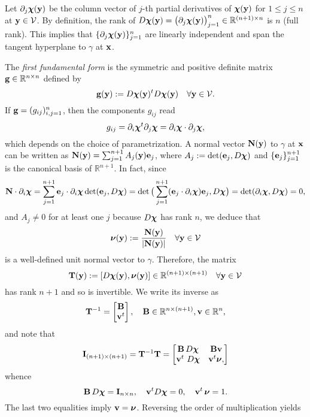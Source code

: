Let $\partial_j{\boldsymbol \chi}({\bf y})$ be the column vector of $j$-th partial derivatives of
${\boldsymbol \chi}({\bf y})$ for $1\le j\le n$ at ${\bf y}\in {\mathcal V}$.
By definition, the rank of $D {\boldsymbol \chi}({\bf y}) = \big(\partial_j{\boldsymbol \chi}({\bf y})\big)_{j=1}^n
\in  {\mathbb R}^{(n+1)\times n}$ is  $n$ (full rank).
This implies that $\{\partial_j{\boldsymbol \chi}({\bf y})\}_{j=1}^n$ are linearly independent and span
the tangent hyperplane to $\gamma$ at ${\bf x}$.

The \emph{first fundamental form} is the symmetric and positive definite matrix
${\bf g}\in {\mathbb R}^{n\times n}$ defined by
\begin{equation}\label{dg:d:first}
{\bf g}({\bf y}) := D {\boldsymbol \chi}({\bf y})^t D {\boldsymbol \chi}({\bf y}) \quad\forall {\bf y}\in\mathcal V.
\end{equation}
If ${\bf g} = (g_{ij})_{i,j=1}^n$, then the components $g_{ij}$ read
$$
g_{ij} = \partial_i{\boldsymbol \chi}^t\partial_j{\boldsymbol \chi} = \partial_i{\boldsymbol \chi}\cdot\partial_j{\boldsymbol \chi},
$$
which depends on the choice of parametrization.
A normal vector ${\bf N}({\bf y})$ to $\gamma$ at ${\bf x}$ can be written as
${\bf N}({\bf y}) = \sum_{j=1}^{n+1} A_j({\bf y}) {\bf e}_j$, where
$A_j:= \textrm{det}({\bf e}_j, D {\boldsymbol \chi})$ and
$\{ {\bf e}_j \}_{j=1}^{n+1}$ is the canonical basis of $\mathbb R^{n+1}$. In fact,
since
%
\[
{\bf N} \cdot \partial_i{\boldsymbol \chi} = \sum_{j=1}^{n+1} {\bf e}_j\cdot\partial_i{\boldsymbol \chi}
\det({\bf e}_j,D{\boldsymbol \chi}) = \det \big( \sum_{j=1}^{n+1} ({\bf e}_j\cdot\partial_i{\boldsymbol \chi})
{\bf e}_j,D{\boldsymbol \chi}\big) = \det(\partial_i{\boldsymbol \chi},D{\boldsymbol \chi}) = 0,
\]
%
and $A_j\ne0$ for at least one $j$ because $D{\boldsymbol \chi}$ has rank $n$, we deduce that
%
\begin{equation}\label{unit-normal}
{\boldsymbol \nu} ({\bf y}) := \frac{{\bf N}({\bf y})}{|{\bf N}({\bf y})|} \quad\forall {\bf y}\in\mathcal V
\end{equation}
%
is a well-defined unit normal vector to $\gamma$. Therefore, the matrix
%
\[
{\bf T} ({\bf y}) := [D{\boldsymbol \chi}({\bf y}),{\boldsymbol \nu}({\bf y})] \in \mathbb{R}^{(n+1)\times(n+1)}
\quad\forall {\bf y}\in\mathcal V
\]
%
has rank $n+1$ and so is invertible. We write its inverse as
%
\[
{\bf T}^{-1} = \begin{bmatrix} {\bf B} \\ {\bf v}^t \end{bmatrix},
\quad
{\bf B} \in \mathbb{R}^{n\times(n+1)}, {\bf v}\in\mathbb{R}^n,
\]
%
and note that
%
\[
{\bf I}_{(n+1)\times(n+1)} = {\bf T}^{-1}{\bf T} =
\begin{bmatrix}
{\bf B} \, D{\boldsymbol \chi} & {\bf B} {\bf v} \\ {\bf v}^t\ D{\boldsymbol \chi} & {\bf v}^t{\boldsymbol \nu},
\end{bmatrix}  
\]
%
whence
%
\[
{\bf B} \, D{\boldsymbol \chi} = {\bf I}_{n\times n},
\quad
{\bf v}^t D{\boldsymbol \chi} = 0,
\quad
{\bf v}^t \, {\boldsymbol \nu} = 1.
\]
%
The last two equalities imply ${\bf v}={\boldsymbol \nu}$. Reversing the order of multiplication yields
